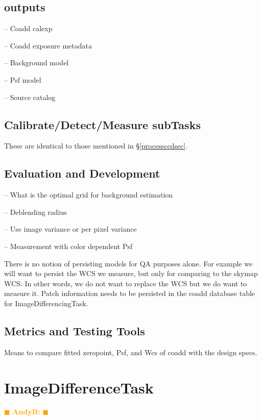 \documentclass[12pt]{article}
\newcommand{\becker} { \textcolor{orange} {
\ensuremath{\blacksquare} {\bf AndyB:}  
\ensuremath{\blacksquare} } }
\begin{document}
\subsection{outputs}

-- Coadd calexp

-- Coadd exposure metadata

-- Background model

-- Psf model

-- Source catalog

\subsection{Calibrate/Detect/Measure subTasks}
These are identical to those mentioned in \S \ref{processccdsec}.

\subsection{Evaluation and Development}

-- What is the optimal grid for background estimation

-- Deblending radius

-- Use image variance or per pixel variance

-- Measurement with color dependent Psf

There is no notion of persisting models for QA purposes alone.  For example we will want to persist
the WCS we measure, but only for comparing to the skymap WCS.  In other words, we do not want to replace the 
WCS but we do want to measure it.  Patch information needs to be persisted in the coadd database table
for ImageDifferencingTask.

\subsection{Metrics and Testing Tools}
Means to compare fitted zeropoint, Psf, and Wcs of coadd with the
design specs.


\clearpage 
\section{ImageDifferenceTask \label{sec-imagedifftask}} \becker


\end{document}
